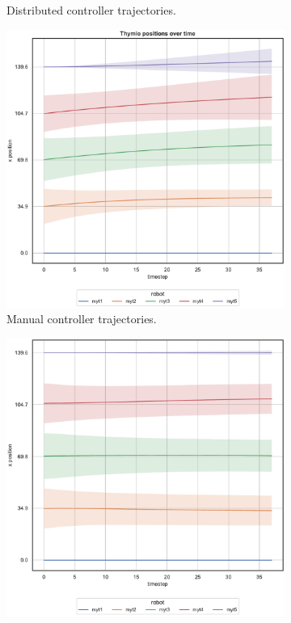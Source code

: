 \begin{figure}[!htb]
\begin{center}
\begin{subfigure}[h]{0.49\textwidth}
			\caption{Distributed controller trajectories.}
		\end{subfigure}
	\end{center}
	\begin{center}
		\begin{subfigure}[h]{0.49\textwidth}
			\centering			
			\includegraphics[width=.92\textwidth]{contents/images/net-d6/position-overtime-manual}%
			\caption{Manual controller trajectories.}
		\end{subfigure}
		\hfill
		\begin{subfigure}[h]{0.49\textwidth}
			\centering
			\includegraphics[width=.92\textwidth]{contents/images/net-c6/position-overtime-learned_communication}

\end{subfigure}
\end{center}
\end{figure}
